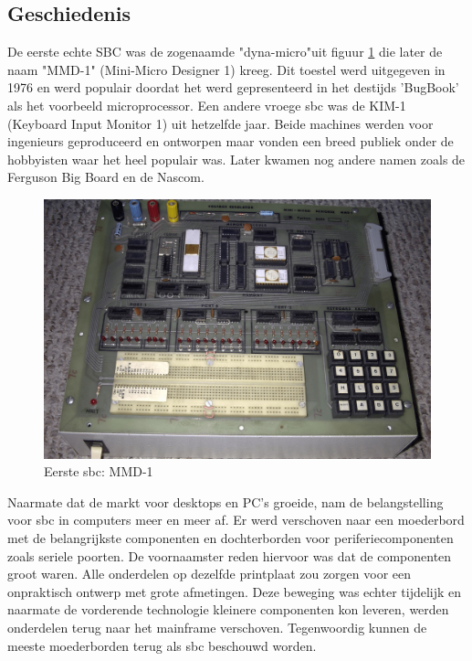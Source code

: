 	\subsection{Geschiedenis}
	De eerste echte SBC was de zogenaamde "dyna-micro"\space uit figuur \ref{fig:eersteSBC} die later de naam "MMD-1" (Mini-Micro Designer 1) kreeg. Dit toestel werd uitgegeven in 1976 en werd populair doordat het werd gepresenteerd in het destijds 'BugBook' als het voorbeeld microprocessor. Een andere vroege \gls{sbc} was de KIM-1 (Keyboard Input Monitor 1) uit hetzelfde jaar. Beide machines werden voor ingenieurs geproduceerd en ontworpen maar vonden een breed publiek onder de hobbyisten waar het heel populair was. Later kwamen nog andere namen zoals de Ferguson Big Board en de Nascom.

	\begin{figure}
		\centering
		\includegraphics[width=120mm]{afbeeldingen/Early_1976_MMD1_Prototype_most_chips_removed.PNG}
		\caption{Eerste \gls{sbc}: MMD-1}
		\label{fig:eersteSBC}
	\end{figure}
	
	Naarmate dat de markt voor desktops en PC's groeide, nam de belangstelling voor \gls{sbc} in computers meer en meer af. Er werd verschoven naar een moederbord met de belangrijkste componenten en dochterborden voor periferiecomponenten zoals seriele poorten. De voornaamster reden hiervoor was dat de componenten groot waren. Alle onderdelen op dezelfde printplaat zou zorgen voor een onpraktisch ontwerp met grote afmetingen. Deze beweging was echter tijdelijk en naarmate de vorderende technologie kleinere componenten kon leveren, werden onderdelen terug naar het mainframe verschoven. Tegenwoordig kunnen de meeste moederborden terug als \gls{sbc} beschouwd worden. 

